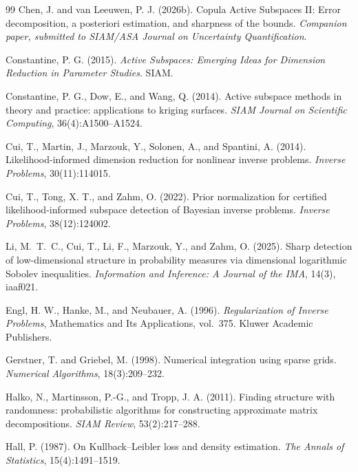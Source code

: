 \begin{thebibliography}{99}
Chen, J. and van Leeuwen, P. J. (2026b).
Copula Active Subspaces II: Error decomposition, a posteriori estimation, and sharpness of the bounds.
\emph{Companion paper, submitted to SIAM/ASA Journal on Uncertainty Quantification}.

Constantine, P. G. (2015).
\emph{Active Subspaces: Emerging Ideas for Dimension Reduction in Parameter Studies}.
SIAM.

Constantine, P. G., Dow, E., and Wang, Q. (2014).
Active subspace methods in theory and practice: applications to kriging surfaces.
\emph{SIAM Journal on Scientific Computing}, 36(4):A1500--A1524.

Cui, T., Martin, J., Marzouk, Y., Solonen, A., and Spantini, A. (2014).
Likelihood-informed dimension reduction for nonlinear inverse problems.
\emph{Inverse Problems}, 30(11):114015.

Cui, T., Tong, X. T., and Zahm, O. (2022).
Prior normalization for certified likelihood-informed subspace detection of Bayesian inverse problems.
\emph{Inverse Problems}, 38(12):124002.

Li, M.~T.~C., Cui, T., Li, F., Marzouk, Y., and Zahm, O. (2025).
Sharp detection of low-dimensional structure in probability measures via dimensional logarithmic Sobolev inequalities.
\emph{Information and Inference: A Journal of the IMA}, 14(3), iaaf021.

Engl, H. W., Hanke, M., and Neubauer, A. (1996).
\emph{Regularization of Inverse Problems}, Mathematics and Its Applications, vol.~375.
Kluwer Academic Publishers.

Gerstner, T. and Griebel, M. (1998).
Numerical integration using sparse grids.
\emph{Numerical Algorithms}, 18(3):209--232.

Halko, N., Martinsson, P.-G., and Tropp, J. A. (2011).
Finding structure with randomness: probabilistic algorithms for constructing approximate matrix decompositions.
\emph{SIAM Review}, 53(2):217--288.

Hall, P. (1987).
On Kullback--Leibler loss and density estimation.
\emph{The Annals of Statistics}, 15(4):1491--1519.


\end{thebibliography}
